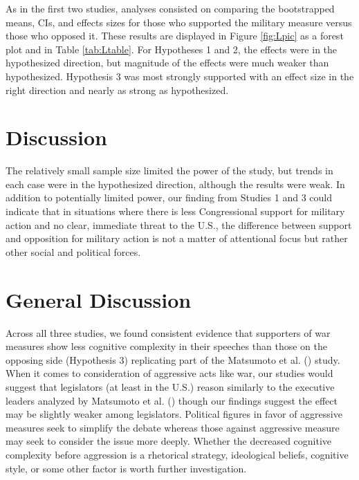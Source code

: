 \documentclass[jou,a4paper]{apa6}
\begin{document}
As in the first two studies, analyses consisted on comparing the bootstrapped means, CIs, and effects sizes for those who supported the military measure versus those who opposed it. These results are displayed in Figure \ref{fig:Lpic} as a forest plot and in Table \ref{tab:Ltable}. For Hypotheses 1 and 2, the effects were in the hypothesized direction, but magnitude of the effects were much weaker than hypothesized. Hypothesis 3 was most strongly supported with an effect size in the right direction and nearly as strong as hypothesized.

\section{Discussion}

The relatively small sample size limited the power of the study, but trends in each case were in the hypothesized direction, although the results were weak. In addition to potentially limited power, our finding from Studies 1 and 3 could indicate that in situations where there is less Congressional support for military action and no clear, immediate threat to the U.S., the difference between support and opposition for military action is not a matter of attentional focus but rather other social and political forces.

\section{General Discussion}

Across all three studies, we found consistent evidence that supporters of war measures show less cognitive complexity in their speeches than those on the opposing side (Hypothesis 3) replicating part of the Matsumoto et al. (\citeyear{Matsumoto2013}) study. When it comes to consideration of aggressive acts like war, our studies would suggest that legislators (at least in the U.S.) reason similarly to the executive leaders analyzed by Matsumoto et al. (\citeyear{Matsumoto2013}) though our findings suggest the effect may be slightly weaker among legislators. Political figures in favor of aggressive measures seek to simplify the debate whereas those against aggressive measure may seek to consider the issue more deeply. Whether the decreased cognitive complexity before aggression is a rhetorical strategy, ideological beliefs, cognitive style, or some other factor is worth further investigation.
\end{document}
